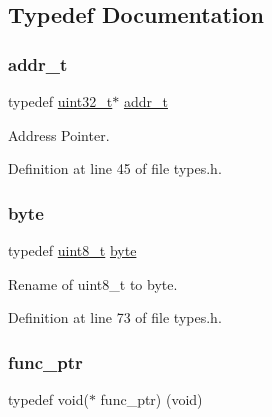 \subsection{Typedef Documentation}
\mbox{\label{a00140_a295f71165288684c38c6bb836fbb3c59_a295f71165288684c38c6bb836fbb3c59}} 
\subsubsection{\texorpdfstring{addr\+\_\+t}{addr\_t}}
{\footnotesize\ttfamily typedef \hyperlink{a00140_a435d1572bf3f880d55459d9805097f62_a435d1572bf3f880d55459d9805097f62}{uint32\+\_\+t}$\ast$ \hyperlink{a00140_a295f71165288684c38c6bb836fbb3c59_a295f71165288684c38c6bb836fbb3c59}{addr\+\_\+t}}



Address Pointer. 



Definition at line 45 of file types.\+h.

\mbox{\label{a00140_ab8ef12fab634c171394422d0ee8baf94_ab8ef12fab634c171394422d0ee8baf94}} 
\subsubsection{\texorpdfstring{byte}{byte}}
{\footnotesize\ttfamily typedef \hyperlink{a00140_aba7bc1797add20fe3efdf37ced1182c5_aba7bc1797add20fe3efdf37ced1182c5}{uint8\+\_\+t} \hyperlink{a00140_ab8ef12fab634c171394422d0ee8baf94_ab8ef12fab634c171394422d0ee8baf94}{byte}}



Rename of uint8\+\_\+t to byte. 



Definition at line 73 of file types.\+h.

\mbox{\label{a00140_a3c06233410074f1dbb8b3eebef3a7847_a3c06233410074f1dbb8b3eebef3a7847}} 
\subsubsection{\texorpdfstring{func\+\_\+ptr}{func\_ptr}}
{\footnotesize\ttfamily typedef void($\ast$ func\+\_\+ptr) (void)}




